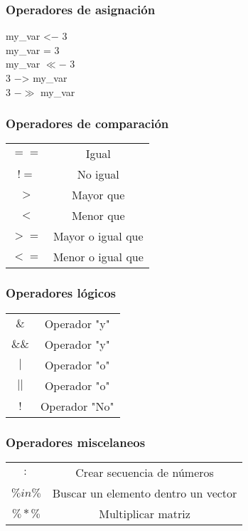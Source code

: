 \documentclass[12pt]{beamer}
\begin{document}
	\begin{frame}
		\frametitle{Operadores de asignación}
		
		my\_var <$-$ 3 \\
		
		my\_var = 3 \\
		
		my\_var $\ll$$-$ 3\\
		
		3 $-$> my\_var\\
		
		3 $-$$\gg$ my\_var		
		
	\end{frame}

	\begin{frame}
		\frametitle{Operadores de comparación}
		\begin{table}
			\centering
		\begin{tabular}{cc}
			\hline
			$==$  & Igual\\
			$!=$& No igual\\
			$>$&  Mayor que\\
			$<$& Menor que\\
			$>=$&  Mayor o igual que\\
			$<=$& Menor o igual que\\
			\hline
		\end{tabular}
	\end{table}
	
	\end{frame}

	\begin{frame}
		\frametitle{Operadores lógicos}
		
		\begin{table}
			\centering
			\begin{tabular}{cc}
				\hline
				$\&$  &Operador "y" \\
				$\&\&$& Operador "y"\\
				$|$&  Operador "o"\\
				$||$& Operador "o"\\
				$!$&  Operador "No"\\
				\hline
			\end{tabular}
		\end{table}
		
		
	\end{frame}

	\begin{frame}
		\frametitle{Operadores miscelaneos}
		
		\begin{table}
			\centering
			\begin{tabular}{cc}
				\hline
				$:$&  Crear secuencia de números\\
				$\%in\%$& Buscar un elemento dentro un vector\\
				$\%*\%$&  Multiplicar matriz\\
				\hline
			\end{tabular}
		\end{table}
		
	\end{frame}
\end{document}

